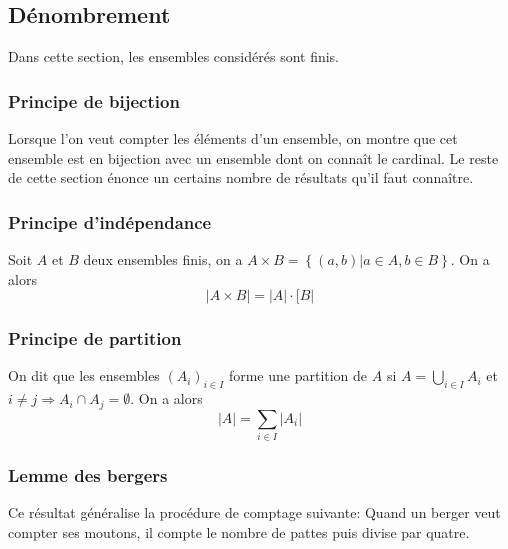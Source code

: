 	\begin{exemple}
\pl{\rep{3cm}}
	\end{exemple}


\sld{\pagebreak[5]}%

\subsection{Dénombrement}

Dans cette section, les ensembles considérés sont finis.

\subsubsection{Principe de bijection}

Lorsque l'on veut compter les éléments d'un ensemble, on montre que cet ensemble est en bijection avec un ensemble dont on connaît le cardinal. Le reste de cette section énonce un certains nombre de résultats qu'il faut connaître.

\subsubsection{Principe d'indépendance}

Soit $A$ et $B$ deux ensembles finis, on a $A \times B = \left\{ (a,b) | a\in A, b\in B \right\} $. On a alors
\[
| A\times B| = |A|\cdot[B|
\]

\subsubsection{Principe de partition}

On dit que les ensembles $(A_i)_{i\in I}$ forme une partition de $A$ si $A = \bigcup_{i\in I} A_i$ et $i\neq j \Rightarrow A_i\cap A_j = \emptyset$. On a alors 
\[
	|A| = \sum_{i\in I} |A_i|
\]

\sld{\vfill\pagebreak[5]}%


\subsubsection{Lemme des bergers}
Ce résultat généralise la procédure de comptage suivante: Quand un berger veut compter ses moutons, il compte le nombre de pattes  puis divise par quatre.

